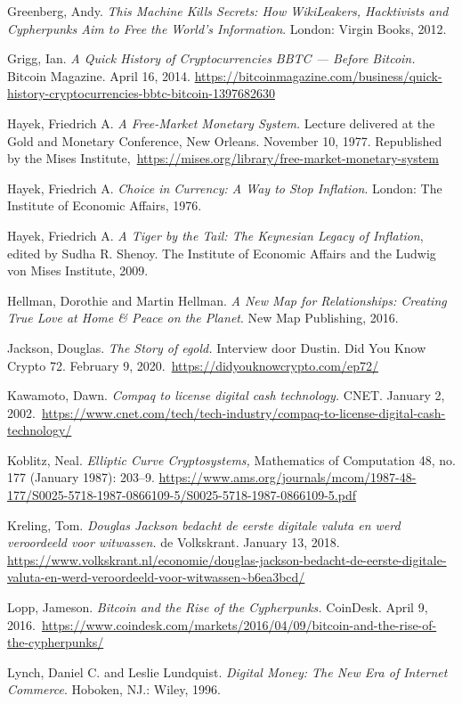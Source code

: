 \documentclass[
  a5paper,
  smalldemyvopaper,11pt,twoside,onecolumn,openright,extrafontsizes,
hidelinks]{memoir}
\begin{document}
{Greenberg, Andy. \emph{This Machine Kills Secrets: How WikiLeakers,
Hacktivists and Cypherpunks Aim to Free the World's Information}.
London: Virgin Books, 2012.

Grigg, Ian. \emph{A Quick History of Cryptocurrencies BBTC --- Before
Bitcoin.} Bitcoin Magazine. April 16, 2014.
\url{https://bitcoinmagazine.com/business/quick-history-cryptocurrencies-bbtc-bitcoin-1397682630}

Hayek, Friedrich A. \emph{A Free-Market Monetary System.} Lecture
delivered at the Gold and Monetary Conference, New Orleans. November 10,
1977. Republished by the Mises
Institute,~\url{https://mises.org/library/free-market-monetary-system}

Hayek, Friedrich A. \emph{Choice in Currency: A Way to Stop Inflation}.
London: The Institute of Economic Affairs, 1976.

Hayek, Friedrich A. \emph{A Tiger by the Tail: The Keynesian Legacy of
Inflation}, edited by Sudha R. Shenoy. The Institute of Economic Affairs
and the Ludwig von Mises Institute, 2009.

Hellman, Dorothie and Martin Hellman. \emph{A New Map for Relationships:
Creating True Love at Home \& Peace on the Planet}. New Map Publishing,
2016.

Jackson, Douglas. \emph{The Story of egold.} Interview door Dustin. Did
You Know Crypto 72. February 9,
2020.~\url{https://didyouknowcrypto.com/ep72/}

Kawamoto, Dawn. \emph{Compaq to license digital cash technology.} CNET.
January 2,
2002.~\url{https://www.cnet.com/tech/tech-industry/compaq-to-license-digital-cash-technology/}

Koblitz, Neal. \emph{Elliptic Curve Cryptosystems,} Mathematics of
Computation 48, no. 177 (January 1987): 203--9.
\url{https://www.ams.org/journals/mcom/1987-48-177/S0025-5718-1987-0866109-5/S0025-5718-1987-0866109-5.pdf}

Kreling, Tom. \emph{Douglas Jackson bedacht de eerste digitale valuta en
werd veroordeeld voor witwassen.} de Volkskrant. January 13, 2018.
\url{https://www.volkskrant.nl/economie/douglas-jackson-bedacht-de-eerste-digitale-valuta-en-werd-veroordeeld-voor-witwassen~b6ea3bcd/}

Lopp, Jameson. \emph{Bitcoin and the Rise of the Cypherpunks.} CoinDesk.
April 9,
2016.~\url{https://www.coindesk.com/markets/2016/04/09/bitcoin-and-the-rise-of-the-cypherpunks/}

Lynch, Daniel C. and Leslie Lundquist. \emph{Digital Money: The New Era
of Internet Commerce}. Hoboken, NJ.: Wiley, 1996.

}
\end{document}
